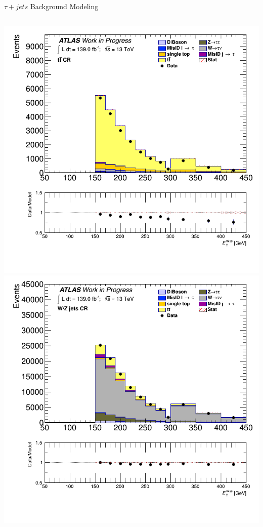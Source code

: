 \documentclass[aspectratio=169,xcolor=table]{beamer}
\begin{document}
\begin{frame}[t]{$\tau+jets$ Background Modeling}
\begin{columns}[t]
          \includegraphics[height=.45\textheight,keepaspectratio=true]{taujet_1p_3p/v09/met_et_TTBAR.png}
          \includegraphics[height=.45\textheight,keepaspectratio=true]{taujet_1p_3p/v09/met_et_WJETS.png}


\end{columns}
\end{frame}
\end{document}
